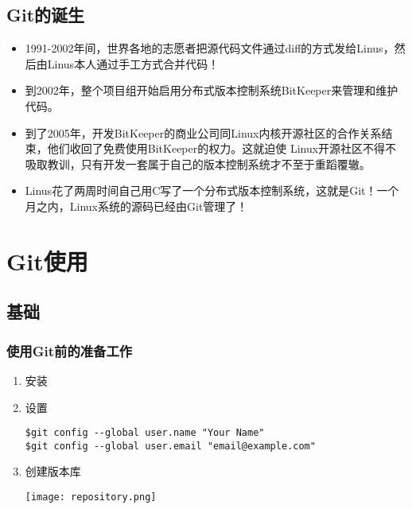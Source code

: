 \documentclass[notheorems,mathserif,table,compress]{beamer}  %
\begin{document}
\subsection{Git的诞生}

\begin{frame}
  \begin{itemize}
  \item 1991-2002年间，世界各地的志愿者把源代码文件通过diff的方式发给Linus，然后由Linus本人通过手工方式合并代码！
  \item 到2002年，整个项目组开始启用分布式版本控制系统BitKeeper来管理和维护代码。
  \item 到了2005年，开发BitKeeper的商业公司同Linux内核开源社区的合作关系结束，他们收回了免费使用BitKeeper的权力。这就迫使 Linux开源社区不得不吸取教训，只有开发一套属于自己的版本控制系统才不至于重蹈覆辙。
  \item Linus花了两周时间自己用C写了一个分布式版本控制系统，这就是Git！一个月之内，Linux系统的源码已经由Git管理了！
  \end{itemize}
\end{frame}

\section{Git使用}

\subsection{基础}

\begin{frame}[fragile]
  \frametitle{使用Git前的准备工作}
  \begin{enumerate}
  \item 安装
  \item 设置

  \verb|$git config --global user.name "Your Name"|\\
  \verb|$git config --global user.email "email@example.com"|
  \item 创建版本库

  \hspace{0.2em}\vspace{1em}\texttt{[image: repository.png]}
  \end{enumerate}
\end{frame}


\end{document}
